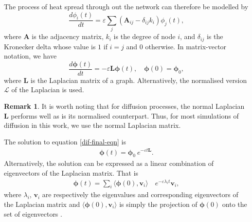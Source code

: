 \documentclass[10pt,a4paper]{article}
\theoremstyle{plain}
\theoremstyle{definition}
\newtheorem{rem}[subsection]{Remark}
\begin{document}
    	The process of heat spread through out the network can therefore be modelled by
    	\begin{equation}
    	\frac{d\phi_i(t)}{dt} = \varepsilon \sum_j (\mathbf{A}_{ij} - \delta_{ij} k_i) \phi_j(t),
    	\label{difusion}
    	\end{equation}
    	where $\mathbf{A}$ is the adjacency matrix, $k_i$ is the degree of node $i$, and $\delta_{ij}$ is the Kronecker delta whose value is $1$ if $i=j$ and $0$ otherwise. In matrix-vector notation, we have
    	\begin{equation}
    	\frac{d\boldsymbol{\phi}(t)}{dt} = -\varepsilon\mathbf{L}\boldsymbol{\phi}(t), \quad \boldsymbol{\phi}(0) = \boldsymbol{\phi}_0 ,
    	\label{dif-final-eqn}
    	\end{equation}
    	where $\mathbf{L}$ is the Laplacian matrix of a graph. Alternatively, the normalised version $\mathcal{L}$ of the Laplacian is used.
    	\begin{rem} 
    		It is worth noting that for diffusion processes, the normal Laplacian $\mathbf{L}$ performs well as is its normalised counterpart. Thus, for most simulations of diffusion in this work, we use the normal Laplacian matrix.
    	\end{rem}
    	The solution to equation \ref{dif-final-eqn} is 
    	\begin{eqnarray}
    	\boldsymbol{\phi}(t) = \boldsymbol{\phi}_0~e^{-\varepsilon t \mathbf{L}}.
    	\end{eqnarray}
    	Alternatively, the solution can be expressed as a linear combination of eigenvectors of the Laplacian matrix. That is
    	 \begin{eqnarray*}
    	 	\boldsymbol{\phi}(t) = \sum_i \langle \boldsymbol{\phi}(0),\mathbf{v}_i \rangle \quad e^{-\varepsilon\lambda_i t} \mathbf{v}_i,  
    	 \end{eqnarray*}
    	 where $\lambda_i$, $\mathbf{v}_i$ are respectively the eigenvalues and corresponding eigenvectors of the Laplacian matrix and $\langle \boldsymbol{\phi}(0),\mathbf{v}_i \rangle$ is simply the projection of $\boldsymbol{\phi}(0)$ onto the set of eigenvectors \citep{anton2007elementary}.
    	 
\end{document}
